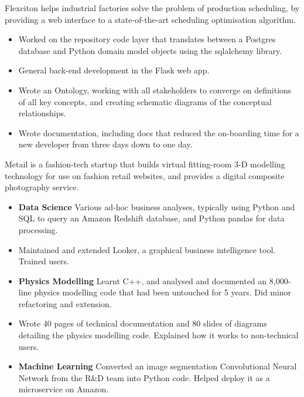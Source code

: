 \documentclass[11pt,a4paper,sans]{moderncv} %
\begin{document}
{Flexciton helps industrial factories solve the problem of production scheduling, by providing a web interface to a state-of-the-art scheduling optimisation algorithm.
\begin{itemize}
	\item Worked on the repository code layer that translates between a Postgres database and Python domain model objects using the sqlalchemy library.
	\item General back-end development in the Flask web app.
	\item Wrote an Ontology, working with all stakeholders to converge on definitions of all key concepts, and creating schematic diagrams of the conceptual relationships.
	\item Wrote documentation, including docs that reduced the on-boarding time for a new developer from three days down to one day.
\end{itemize}}

\vspace{0.2em}

{Metail is a fashion-tech startup that builds virtual fitting-room 3-D modelling technology for use on fashion retail websites, and provides a digital composite photography service.
	\begin{itemize}
		\item \textbf{Data Science} Various ad-hoc business analyses, typically using Python and SQL to query an Amazon Redshift database, and Python pandas for data processing.
		\item Maintained and extended Looker, a graphical business intelligence tool. Trained users.
		\item \textbf{Physics Modelling} Learnt C++, and analysed and documented an 8,000-line physics modelling code that had been untouched for 5 years. Did minor refactoring and extension.
		\item Wrote 40 pages of technical documentation and 80 slides of diagrams detailing the physics modelling code. Explained how it works to non-technical users.
		\item \textbf{Machine Learning} Converted an image segmentation Convolutional Neural Network from the R\&D team into Python code.  Helped deploy it as a microservice on Amazon.
	\end{itemize}
}
\end{document}
